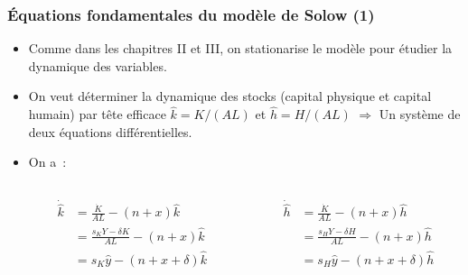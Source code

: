 \documentclass[10pt,notheorems]{beamer}
\theoremstyle{plain}
\theoremstyle{definition} %
\begin{document}
\begin{frame}
  \frametitle{Équations fondamentales du modèle de Solow (1)}

  \begin{itemize}

  \item Comme dans les chapitres II et III, on stationarise le modèle pour étudier la dynamique des variables.\newline

  \item On veut déterminer la dynamique des stocks (capital physique et capital humain) par tête efficace $\hat k = K/(AL)$ et $\hat h = H/(AL)$ $\Rightarrow$ Un système de deux équations différentielles.\newline

  \item On a~:
    \medskip
    \begin{columns}
      \begin{column}{0.5\textwidth}
        \[
          \begin{split}
            \dot{\hat k} &= \frac{\dot K}{AL}-(n+x)\hat k\\
                         &= \frac{s_KY-\delta K}{AL}-(n+x)\hat k \\
                         &= s_K\hat y - (n+x+\delta) \hat k
          \end{split}
        \]
      \end{column}
      \begin{column}{0.5\textwidth}  %
        \[
          \begin{split}
            \dot{\hat h} &= \frac{\dot K}{AL}-(n+x)\hat h\\
                         &= \frac{s_HY-\delta H}{AL}-(n+x)\hat h \\
                         &= s_H\hat y - (n+x+\delta) \hat h
          \end{split}
        \]
      \end{column}
    \end{columns}

  \end{itemize}

\end{frame}
\end{document}
